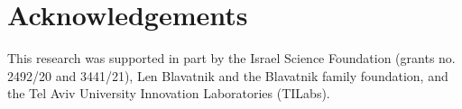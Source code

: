 \section{Acknowledgements}\label{sec:acknowledgements}
This research was supported in part by the Israel Science Foundation (grants no. 2492/20 and 3441/21), Len Blavatnik and the Blavatnik family foundation, and the Tel Aviv University Innovation Laboratories (TILabs).
